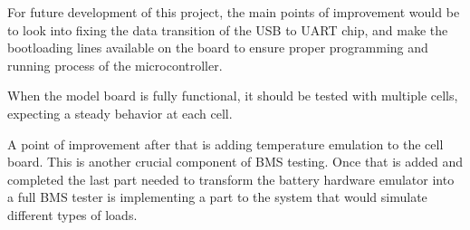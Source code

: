 \IEEEPARstart
{F}{or} future development of this project, the main points of improvement would be 
to look into fixing the data transition of the USB to UART chip, and make the 
bootloading lines available on the board to ensure proper programming and 
running process of the microcontroller. 

When the model board is fully functional, it should be tested with multiple cells, 
expecting a steady behavior at each cell.

A point of improvement after that is adding temperature emulation to the cell board. 
This is another crucial component of BMS testing. Once that is added and completed 
the last part needed to transform the battery hardware emulator into a full BMS 
tester is implementing a part to the system that would simulate different types of 
loads. 
